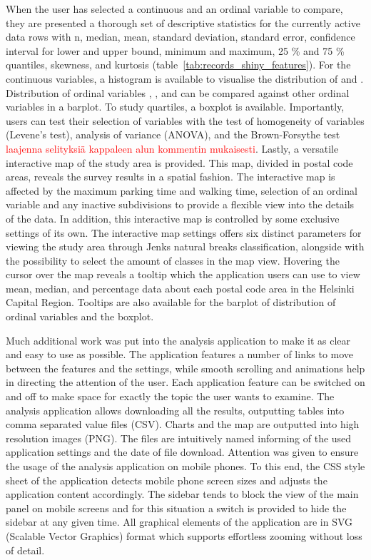 When the user has selected a continuous and an ordinal variable to compare, they are presented a thorough set of descriptive statistics for the currently active data rows with n, median, mean, standard deviation, standard error, confidence interval for lower and upper bound, minimum and maximum, 25 \% and 75 \% quantiles, skewness, and kurtosis (table~\ref{tab:records_shiny_features}). For the continuous variables, a histogram is available to visualise the distribution of  and . Distribution of ordinal variables , , and  can be compared against other ordinal variables in a barplot. To study quartiles, a boxplot is available. Importantly, users can test their selection of variables with the test of homogeneity of variables (Levene's test), analysis of variance (ANOVA), and the Brown-Forsythe test \textcolor{red}{laajenna selityksiä kappaleen alun kommentin mukaisesti}. Lastly, a versatile interactive map of the study area is provided. This map, divided in postal code areas, reveals the survey results in a spatial fashion. The interactive map is affected by the maximum parking time and walking time, selection of an ordinal variable and any inactive subdivisions to provide a flexible view into the details of the data. In addition, this interactive map is controlled by some exclusive settings of its own. The interactive map settings offers six distinct parameters for viewing the study area through Jenks natural breaks classification, alongside with the possibility to select the amount of classes in the map view. Hovering the cursor over the map reveals a tooltip which the application users can use to view mean, median, and percentage data about each postal code area in the Helsinki Capital Region. Tooltips are also available for the barplot of distribution of ordinal variables and the boxplot.

Much additional work was put into the analysis application to make it as clear and easy to use as possible. The application features a number of links to move between the features and the settings, while smooth scrolling and animations help in directing the attention of the user. Each application feature can be switched on and off to make space for exactly the topic the user wants to examine. The analysis application allows downloading all the results, outputting tables into comma separated value files (CSV). Charts and the map are outputted into high resolution images (PNG). The files are intuitively named informing of the used application settings and the date of file download. Attention was given to ensure the usage of the analysis application on mobile phones. To this end, the CSS style sheet of the application detects mobile phone screen sizes and adjusts the application content accordingly. The sidebar tends to block the view of the main panel on mobile screens and for this situation a switch is provided to hide the sidebar at any given time. All graphical elements of the application are in SVG (Scalable Vector Graphics) format which supports effortless zooming without loss of detail.

